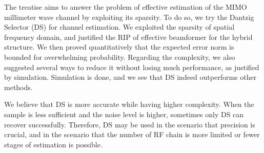 
\startchapter [title={Conclusion}]

The treatise aims to answer the problem of effective estimation of the MIMO millimeter wave channel by exploiting its sparsity.
To do so, we try the Dantzig Selector (DS) for channel estimation.
We exploited the sparsity of spatial frequency domain, and justified the RIP of effective beamformer for the hybrid structure.
We then proved quantitatively that the expected error norm is bounded for overwhelming probability.
Regarding the complexity, we also suggested several ways to reduce it without losing much performance, as justified by simulation.
Simulation is done, and we see that DS indeed outperforms other methods.

We believe that DS is more accurate while having higher complexity.
When the sample is less sufficient and the noise level is higher, sometimes only DS can recover successfully.
Therefore, DS may be used in the scenario that precision is crucial, and in the scenario that the number of RF chain is more limited or fewer stages of estimation is possible.


\stopchapter


